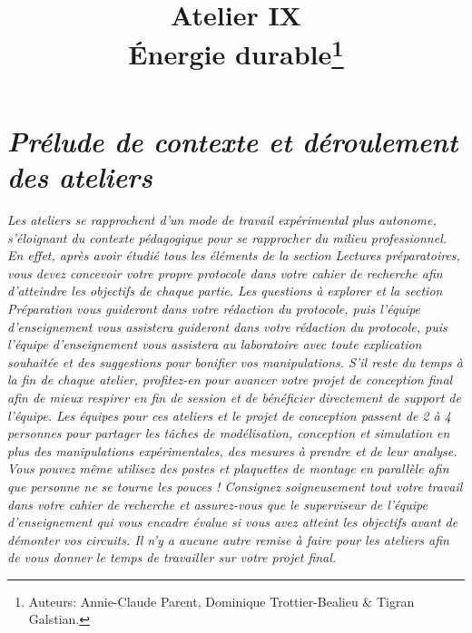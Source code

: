 \documentclass[canadien,12pt,oneside,letterpaper]{article}
\title{\textbf{Atelier IX}\\Énergie durable\thanks{Auteurs: Annie-Claude Parent, Dominique Trottier-Bealieu \& Tigran Galstian.}}
\date{}
\begin{document}
\maketitle \vspace{-17ex}
\section{\textit{\textbf{Prélude de contexte et déroulement des ateliers}}}
\vspace{-2ex}
\textit{Les ateliers se rapprochent d’un mode de travail expérimental plus autonome,
s’éloignant du contexte pédagogique pour se rapprocher du milieu professionnel. En
effet, après avoir étudié tous les éléments de la section Lectures préparatoires, vous
devez concevoir votre propre protocole dans votre cahier de recherche afin d’atteindre
les objectifs de chaque partie. Les questions à explorer et la section Préparation vous
guideront dans votre rédaction du protocole, puis l’équipe d’enseignement vous assistera
guideront dans votre rédaction du protocole, puis l’équipe d’enseignement vous assistera
au laboratoire avec toute explication souhaitée et des suggestions pour bonifier
vos manipulations. S’il reste du temps à la fin de chaque atelier, profitez-en pour
avancer votre projet de conception final afin de mieux respirer en fin de session et
de bénéficier directement de support de l’équipe.
Les équipes pour ces ateliers et le projet de conception passent de 2 à 4 personnes
pour partager les tâches de modélisation, conception et simulation en plus des manipulations
expérimentales, des mesures à prendre et de leur analyse. Vous pouvez
même utilisez des postes et plaquettes de montage en parallèle afin que personne ne
se tourne les pouces ! Consignez soigneusement tout votre travail dans votre cahier
de recherche et assurez-vous que le superviseur de l’équipe d’enseignement qui vous
encadre évalue si vous avez atteint les objectifs avant de démonter vos circuits. Il
n’y a aucune autre remise à faire pour les ateliers afin de vous donner le temps de
travailler sur votre projet final.}
\end{document}
